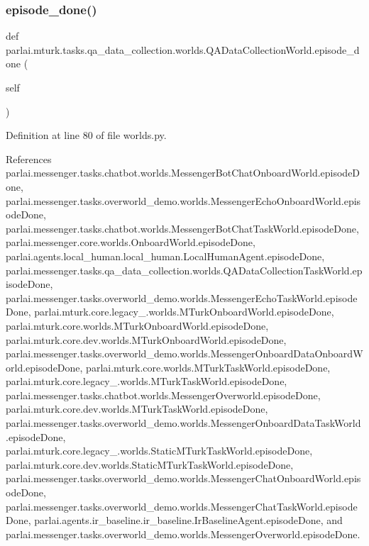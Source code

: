 \subsubsection{\texorpdfstring{episode\+\_\+done()}{episode\_done()}}
{\footnotesize\ttfamily def parlai.\+mturk.\+tasks.\+qa\+\_\+data\+\_\+collection.\+worlds.\+Q\+A\+Data\+Collection\+World.\+episode\+\_\+done (\begin{DoxyParamCaption}\item[{}]{self }\end{DoxyParamCaption})}



Definition at line 80 of file worlds.\+py.



References parlai.\+messenger.\+tasks.\+chatbot.\+worlds.\+Messenger\+Bot\+Chat\+Onboard\+World.\+episode\+Done, parlai.\+messenger.\+tasks.\+overworld\+\_\+demo.\+worlds.\+Messenger\+Echo\+Onboard\+World.\+episode\+Done, parlai.\+messenger.\+tasks.\+chatbot.\+worlds.\+Messenger\+Bot\+Chat\+Task\+World.\+episode\+Done, parlai.\+messenger.\+core.\+worlds.\+Onboard\+World.\+episode\+Done, parlai.\+agents.\+local\+\_\+human.\+local\+\_\+human.\+Local\+Human\+Agent.\+episode\+Done, parlai.\+messenger.\+tasks.\+qa\+\_\+data\+\_\+collection.\+worlds.\+Q\+A\+Data\+Collection\+Task\+World.\+episode\+Done, parlai.\+messenger.\+tasks.\+overworld\+\_\+demo.\+worlds.\+Messenger\+Echo\+Task\+World.\+episode\+Done, parlai.\+mturk.\+core.\+legacy\+\_.\+worlds.\+M\+Turk\+Onboard\+World.\+episode\+Done, parlai.\+mturk.\+core.\+worlds.\+M\+Turk\+Onboard\+World.\+episode\+Done, parlai.\+mturk.\+core.\+dev.\+worlds.\+M\+Turk\+Onboard\+World.\+episode\+Done, parlai.\+messenger.\+tasks.\+overworld\+\_\+demo.\+worlds.\+Messenger\+Onboard\+Data\+Onboard\+World.\+episode\+Done, parlai.\+mturk.\+core.\+worlds.\+M\+Turk\+Task\+World.\+episode\+Done, parlai.\+mturk.\+core.\+legacy\+\_.\+worlds.\+M\+Turk\+Task\+World.\+episode\+Done, parlai.\+messenger.\+tasks.\+chatbot.\+worlds.\+Messenger\+Overworld.\+episode\+Done, parlai.\+mturk.\+core.\+dev.\+worlds.\+M\+Turk\+Task\+World.\+episode\+Done, parlai.\+messenger.\+tasks.\+overworld\+\_\+demo.\+worlds.\+Messenger\+Onboard\+Data\+Task\+World.\+episode\+Done, parlai.\+mturk.\+core.\+legacy\+\_.\+worlds.\+Static\+M\+Turk\+Task\+World.\+episode\+Done, parlai.\+mturk.\+core.\+dev.\+worlds.\+Static\+M\+Turk\+Task\+World.\+episode\+Done, parlai.\+messenger.\+tasks.\+overworld\+\_\+demo.\+worlds.\+Messenger\+Chat\+Onboard\+World.\+episode\+Done, parlai.\+messenger.\+tasks.\+overworld\+\_\+demo.\+worlds.\+Messenger\+Chat\+Task\+World.\+episode\+Done, parlai.\+agents.\+ir\+\_\+baseline.\+ir\+\_\+baseline.\+Ir\+Baseline\+Agent.\+episode\+Done, and parlai.\+messenger.\+tasks.\+overworld\+\_\+demo.\+worlds.\+Messenger\+Overworld.\+episode\+Done.

